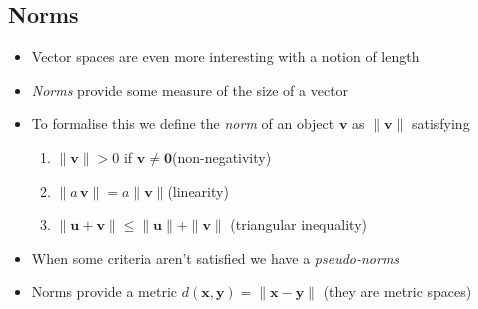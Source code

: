 \Outline

\begin{slide}
\section[-2]{Norms}

\begin{PauseHighLight}
  \begin{itemize}
  \item Vector spaces are even more interesting with a notion of length\pause
  \item \emph{Norms} provide some measure of the size of a vector\pause
  \item To formalise this we define the \emph{norm} of an object
    $\bm{v}$ as  $\|\bm{v}\|$ satisfying
    \begin{enumerate}
    \item $\| \bm{v} \| >0$ if $\bm{v}\neq\bm{0}$\hfill(non-negativity)\pause
    \item $\| a\,\bm{v} \| = a \| \bm{v} \|$\hfill(linearity)\pause
    \item $\| \bm{u} + \bm{v} \| \leq \| \bm{u} \| + \| \bm{v} \|$
      \hfill (triangular inequality)\pause
    \end{enumerate}
  \item When some criteria aren't satisfied we have a
    \emph{pseudo-norms}\pause
  \item Norms provide a metric $d(\bm{x}, \bm{y}) = \|\bm{x}-\bm{y}\|$
    (they are metric spaces)\pause
  \end{itemize}
\end{PauseHighLight}

\end{slide}



